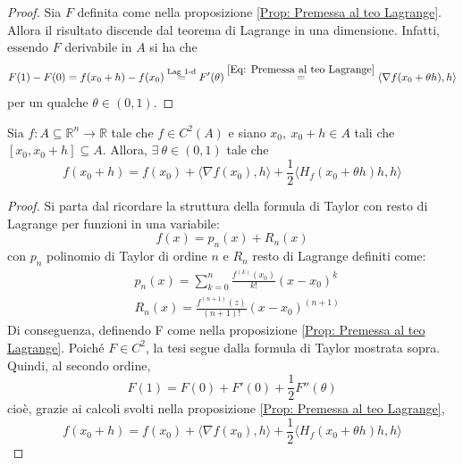     \begin{proof}
        Sia $F$ definita come nella proposizione \ref{Prop: Premessa al teo Lagrange}. Allora il risultato discende dal teorema di Lagrange in una dimensione. Infatti, essendo $F$ derivabile in $A$ si ha che
        \begin{equation}
            F(1)-F(0)=f(x_0+h)-f(x_0)\overset{\text{Lag 1-d}}{=}F'(\theta)\overset{\eqref{Eq: Premessa al teo Lagrange}}{=}\langle \nabla f(x_0+ \theta h), h \rangle
        \end{equation}
        per un qualche $\theta \in (0,1)$.
    \end{proof} 
\begin{theorem} \label{Teo: Taylor con resto di Lagrange}
    Sia $f:A \subseteq \mathbb{R}^n \to \mathbb{R}$ tale che $f\in C^2(A)$ e siano $x_0,\ x_0+h \in A$ tali che $[x_0, x_0+h] \subseteq A$. Allora, $\exists\ \theta \in (0,1)$ tale che
    \begin{equation}
        f(x_0+h)=f(x_0)+ \langle \nabla f(x_0), h \rangle + \frac{1}{2}\langle H_f(x_0+\theta h)h,h \rangle 
    \end{equation} 
\end{theorem}
    \begin{proof}
        Si parta dal ricordare la struttura della formula di Taylor con resto di Lagrange per funzioni in una variabile:
        \begin{equation}
            f(x)=p_n(x)+R_n(x)
        \end{equation}
        con $p_n$ polinomio di Taylor di ordine $n$ e $R_n$ resto di Lagrange definiti come:
        \begin{equation}
            \begin{aligned}
                &p_n(x)=\sum\limits_{k=0}^{n}{\frac{f^{(k)}(x_0)}{k!}(x-x_0)^k}\\
                &R_n(x)=\frac{f^{(n+1)}(z)}{(n+1)!}(x-x_0)^{(n+1)}
            \end{aligned}
        \end{equation}
        Di conseguenza, definendo F come nella proposizione \ref{Prop: Premessa al teo Lagrange}. Poiché $F \in C^2$, la tesi segue dalla formula di Taylor mostrata sopra.
        Quindi, al secondo ordine, 
        \begin{equation}
            F(1)=F(0)+F'(0)+\frac{1}{2}F''(\theta)
        \end{equation}
        cioè, grazie ai calcoli svolti nella proposizione \ref{Prop: Premessa al teo Lagrange}, 
        \begin{equation}
            f(x_0+h)= f(x_0)+\langle \nabla f(x_0), h \rangle + \frac{1}{2}\langle H_f(x_0+ \theta h)h, h\rangle
        \end{equation}
    \end{proof}
